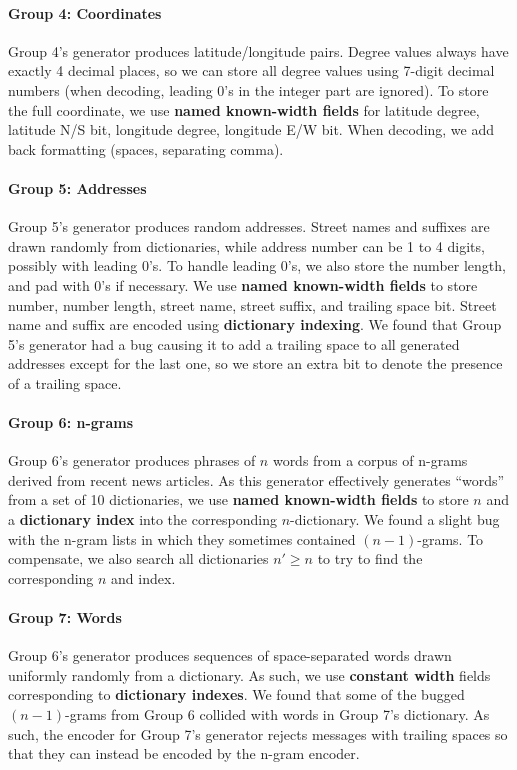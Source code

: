 \documentclass[titlepage]{article}
\begin{document}
\paragraph{Group 4: Coordinates} Group 4's generator produces latitude/longitude pairs. Degree values always have exactly 4 decimal places, so we can store all degree values using 7-digit decimal numbers (when decoding, leading 0's in the integer part are ignored). To store the full coordinate, we use \textbf{named known-width fields} for latitude degree, latitude N/S bit, longitude degree, longitude E/W bit. When decoding, we add back formatting (spaces, separating comma).

\paragraph{Group 5: Addresses} Group 5's generator produces random addresses. Street names and suffixes are drawn randomly from dictionaries, while address number can be 1 to 4 digits, possibly with leading 0's. To handle leading 0's, we also store the number length, and pad with 0's if necessary. We use \textbf{named known-width fields} to store number, number length, street name, street suffix, and trailing space bit. Street name and suffix are encoded using \textbf{dictionary indexing}. We found that Group 5's generator had a bug causing it to add a trailing space to all generated addresses except for the last one, so we store an extra bit to denote the presence of a trailing space.

\paragraph{Group 6: n-grams} Group 6's generator produces phrases of $n$ words from a corpus of n-grams derived from recent news articles. As this generator effectively generates ``words'' from a set of 10 dictionaries, we use \textbf{named known-width fields} to store $n$ and a \textbf{dictionary index} into the corresponding $n$-dictionary. We found a slight bug with the n-gram lists in which they sometimes contained $(n-1)$-grams. To compensate, we also search all dictionaries $n' \ge n$ to try to find the corresponding $n$ and index.

\paragraph{Group 7: Words} Group 6's generator produces sequences of space-separated words drawn uniformly randomly from a dictionary. As such, we use \textbf{constant width} fields corresponding to \textbf{dictionary indexes}. We found that some of the bugged $(n-1)$-grams from Group 6 collided with words in Group 7's dictionary. As such, the encoder for Group 7's generator rejects messages with trailing spaces so that they can instead be encoded by the n-gram encoder.
\end{document}

